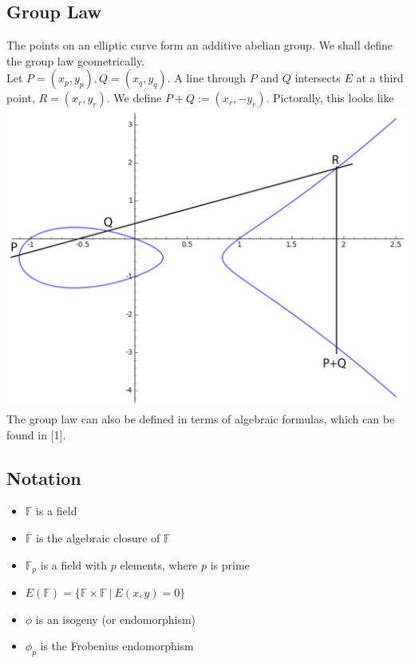 \documentclass[12pt,twoside]{article}
\newcommand\given[1][]{\:#1\vert\:}
\begin{document}
\subsection{Group Law} 
The points on an elliptic curve form an additive abelian group. We shall define the group law geometrically. \\
Let $P = (x_p, y_p), Q = (x_q, y_q)$. A line through $P$ and $Q$ intersects $E$ at a third point, $R = (x_r,y_r)$. We define $P + Q := (x_r,-y_r)$. Pictorally, this looks like \\
\includegraphics[width=6in]{grouplaw.png}
The group law can also be defined in terms of algebraic formulas, which can be found in [1]. %

\subsection{Notation}
\begin{itemize}
\item $\mathbb F$ is a field
\item $\overline{\mathbb F}$ is the algebraic closure of $\mathbb F$
\item $\mathbb F_p$ is a field with $p$ elements, where $p$ is prime
\item $E(\mathbb F) = \{\mathbb F \times \mathbb F \given E(x,y) = 0\}$
\item $\phi$ is an isogeny (or endomorphism)
\item $\phi_p$ is the Frobenius endomorphism
\end{itemize}
\end{document}
